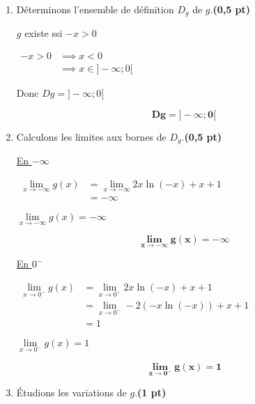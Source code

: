 \documentclass[12pt,a4paper]{article}
\begin{document}
\begin{enumerate}
    \item Déterminons l’ensemble de définition \( D_g \) de \( g \).\hfill \textbf{(0,5 pt)}

          \(g\) existe ssi \(-x>0\)

          \(\begin{aligned}
              -x>0 & \implies x<0              \\
                   & \implies x\in ]-\infty;0[
          \end{aligned}\)

          Donc \(Dg=]-\infty;0[\)

          \begin{resultbox}
              \[
                  \mathbf{Dg=]-\infty;0[}
              \]
          \end{resultbox}

    \item Calculons les limites aux bornes de \( D_g \).\hfill \textbf{(0,5 pt)}

          \underline{En $-\infty$}

          \( \begin{aligned}
              \lim\limits_{x\to -\infty}g(x) & =\lim\limits_{x\to -\infty} 2x \ln(-x) + x + 1 \\
                                             & =-\infty
          \end{aligned} \)

          \( \lim\limits_{x\to -\infty}g(x) = -\infty \)

          \begin{resultbox}
              \[
                  \mathbf{\lim\limits_{x\to -\infty}g(x) = -\infty}
              \]
          \end{resultbox}

          \underline{En $0^{-}$}

          \( \begin{aligned}
              \lim\limits_{x\to 0^{-}}g(x) & =\lim\limits_{x\to 0^{-}} 2x \ln(-x) + x + 1     \\
                                           & =\lim\limits_{x\to 0^{-}} -2(-x \ln(-x)) + x + 1 \\
                                           & =1
          \end{aligned} \)

          \( \lim\limits_{x\to 0^{-}}g(x) = 1 \)

          \begin{resultbox}
              \[
                  \mathbf{\lim\limits_{x\to 0^{-}}g(x) = 1}
              \]
          \end{resultbox}
    \item Étudions les variations de \( g \).\hfill \textbf{(1 pt)}


\end{enumerate}
\end{document}
